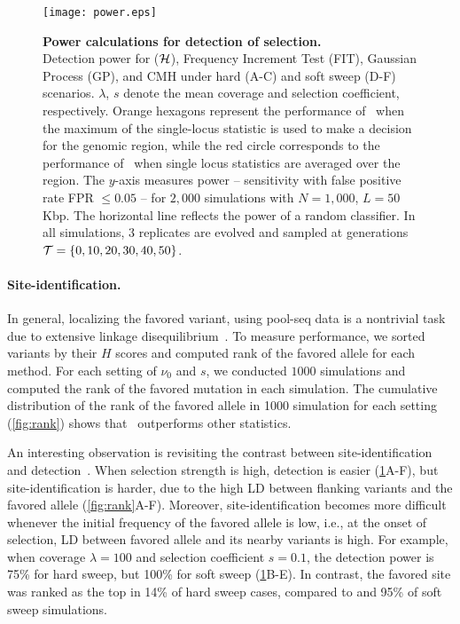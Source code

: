 \documentclass[9pt,twocolumn,twoside]{gsajnl}
\begin{document}
\begin{figure}
	\centering
	\texttt{[image: power.eps]}
	\caption{ {\bf Power calculations for detection of selection.}\\
		Detection power for \comale (${\cal H}$), Frequency Increment
		Test (FIT), Gaussian Process (GP), and CMH under hard (A-C)
		and soft sweep (D-F) scenarios. $\lambda$, $s$ denote the
		mean coverage and selection coefficient, respectively.
		Orange hexagons represent the performance of \comale\ when
		the maximum of the single-locus statistic is used to make a
		decision for the genomic region, while the red circle
		corresponds to the performance of \comale\ when single locus
		statistics are averaged over the region.  The $y$-axis
		measures power -- sensitivity with false positive rate FPR
		$\le 0.05$ -- for $2,000$ simulations with $N=1,000$,
		$L=50$Kbp. The horizontal line reflects the power of a
		random classifier.  In all simulations, 3 replicates are
		evolved and sampled at generations
		${\cal T}=\{0,10,20,30,40,50\}$.}
	\label{fig:power}
\end{figure}
\paragraph{Site-identification.}
In general, localizing the favored variant, using pool-seq data is a
nontrivial task due to extensive linkage
disequilibrium~\cite{tobler2014massive}.  To measure performance, we
sorted variants by their $H$ scores and computed rank of the favored
allele for each method. For each setting of $\nu_0$ and $s$, we
conducted $1000$ simulations and computed the rank of the favored
mutation in each simulation. The cumulative distribution of the rank
of the favored allele in 1000 simulation for each setting
(\ref{fig:rank}) shows that \comale\ outperforms other statistics.

An interesting observation is revisiting the contrast between
site-identification and
detection~\cite{long2013massive,tobler2014massive}.  When selection
strength is high, detection is easier (\ref{fig:power}A-F), but
site-identification is harder, due to the high LD between flanking
variants and the favored allele (\ref{fig:rank}A-F).  Moreover,
site-identification becomes more difficult whenever the initial
frequency of the favored allele is low, i.e., at the onset of
selection, LD between favored allele and its nearby variants is
high. For example, when coverage $\lambda=100$ and selection
coefficient $s=0.1$, the detection power is 75\% for hard sweep, but
100\% for soft sweep (\ref{fig:power}B-E). In contrast, the favored
site was ranked as the top in 14\% of hard sweep cases, compared to
and 95\% of soft sweep simulations. 
\end{document}
